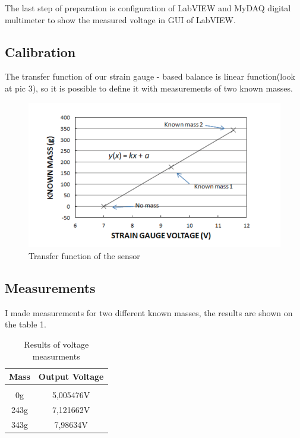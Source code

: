 \documentclass[english]{article}
\begin{document}
The last step of preparation is configuration of LabVIEW and MyDAQ digital multimeter to show the measured voltage in GUI of LabVIEW.

\subsection{Calibration}

The transfer function of our strain gauge - based balance is linear function(look at pic 3), so it is possible to define it with measurements of two known masses.

\begin{figure}[H]
\centerline{\includegraphics[scale=0.5]{labview/graph}}
\caption{Transfer function of the sensor\cite{sv}}
\end{figure}

\subsection{Measurements}
I made measurements for two different known masses, the results are shown on the table 1.

\begin{table}[H]
  \caption{Results of voltage measurments}
    \begin{center}
      \begin{tabular}{ c c }

        Mass & Output Voltage \\
        \hline\\
        0g & 5,005476V \\
        243g & 7,121662V \\
        343g & 7,98634V \\
      \end{tabular}
    \end{center}
  \end{table}
  
\end{document}
